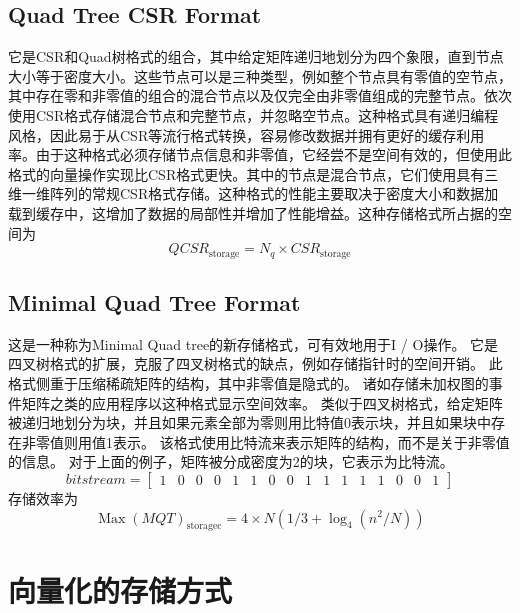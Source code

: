 \documentclass[forprint]{WHUBachelor}
\begin{document}
\subsection{Quad Tree CSR Format}
它是CSR和Quad树格式的组合，其中给定矩阵递归地划分为四个象限，直到节点大小等于密度大小\cite{Zhang2013Implementing}。这些节点可以是三种类型，例如整个节点具有零值的空节点，其中存在零和非零值的组合的混合节点以及仅完全由非零值组成的完整节点。依次使用CSR格式存储混合节点和完整节点，并忽略空节点。这种格式具有递归编程风格，因此易于从CSR等流行格式转换，容易修改数据并拥有更好的缓存利用率。由于这种格式必须存储节点信息和非零值，它经尝不是空间有效的，但使用此格式的向量操作实现比CSR格式更快。其中的节点是混合节点，它们使用具有三维一维阵列的常规CSR格式存储。这种格式的性能主要取决于密度大小和数据加载到缓存中，这增加了数据的局部性并增加了性能增益。这种存储格式所占据的空间为
\begin{equation} 
Q C S R_{\text {storage}}=N_{q} \times C S R_{\text {storage}}
 \end{equation}
\subsection{Minimal Quad Tree Format}
这是一种称为Minimal Quad tree的新存储格式，可有效地用于I / O操作\cite{Langr2015Efficient}。 它是四叉树格式的扩展，克服了四叉树格式的缺点，例如存储指针时的空间开销。 此格式侧重于压缩稀疏矩阵的结构，其中非零值是隐式的。 诸如存储未加权图的事件矩阵之类的应用程序以这种格式显示空间效率。 类似于四叉树格式，给定矩阵被递归地划分为块，并且如果元素全部为零则用比特值0表示块，并且如果块中存在非零值则用值1表示。 该格式使用比特流来表示矩阵的结构，而不是关于非零值的信息。 对于上面的例子，矩阵被分成密度为2的块，它表示为比特流。
\begin{equation} 
bitstream=\left[ \begin{array}{cccccccccccccccc}{1} & {0} & {0} & {0} & {1} & {1} & {0} & {0} & {1} & {1} & {1} & {1} & {1} & {0} & {0} & {1}\end{array}\right]
 \end{equation}
存储效率为
\begin{equation} 
\operatorname{Max}(MQT)_{\text {storagec}}=4 \times N\left(1 / 3+\log _{4}\left(n^{2} / N\right)\right)
 \end{equation}
\section{向量化的存储方式}
\end{document}
